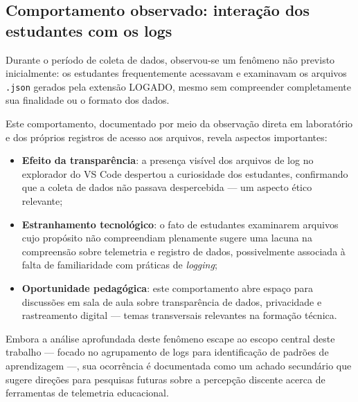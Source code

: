 \subsection{Comportamento observado: interação dos estudantes com os logs}

Durante o período de coleta de dados, observou-se um fenômeno não previsto inicialmente: os estudantes frequentemente acessavam e examinavam os arquivos \texttt{.json} gerados pela extensão LOGADO, mesmo sem compreender completamente sua finalidade ou o formato dos dados.

Este comportamento, documentado por meio da observação direta em laboratório e dos próprios registros de acesso aos arquivos, revela aspectos importantes:

\begin{itemize}
    \item \textbf{Efeito da transparência}: a presença visível dos arquivos de log no explorador do VS Code despertou a curiosidade dos estudantes, confirmando que a coleta de dados não passava despercebida — um aspecto ético relevante;

    \item \textbf{Estranhamento tecnológico}: o fato de estudantes examinarem arquivos cujo propósito não compreendiam plenamente sugere uma lacuna na compreensão sobre telemetria e registro de dados, possivelmente associada à falta de familiaridade com práticas de \textit{logging};

    \item \textbf{Oportunidade pedagógica}: este comportamento abre espaço para discussões em sala de aula sobre transparência de dados, privacidade e rastreamento digital — temas transversais relevantes na formação técnica.
\end{itemize}

Embora a análise aprofundada deste fenômeno escape ao escopo central deste trabalho — focado no agrupamento de logs para identificação de padrões de aprendizagem —, sua ocorrência é documentada como um achado secundário que sugere direções para pesquisas futuras sobre a percepção discente acerca de ferramentas de telemetria educacional.

